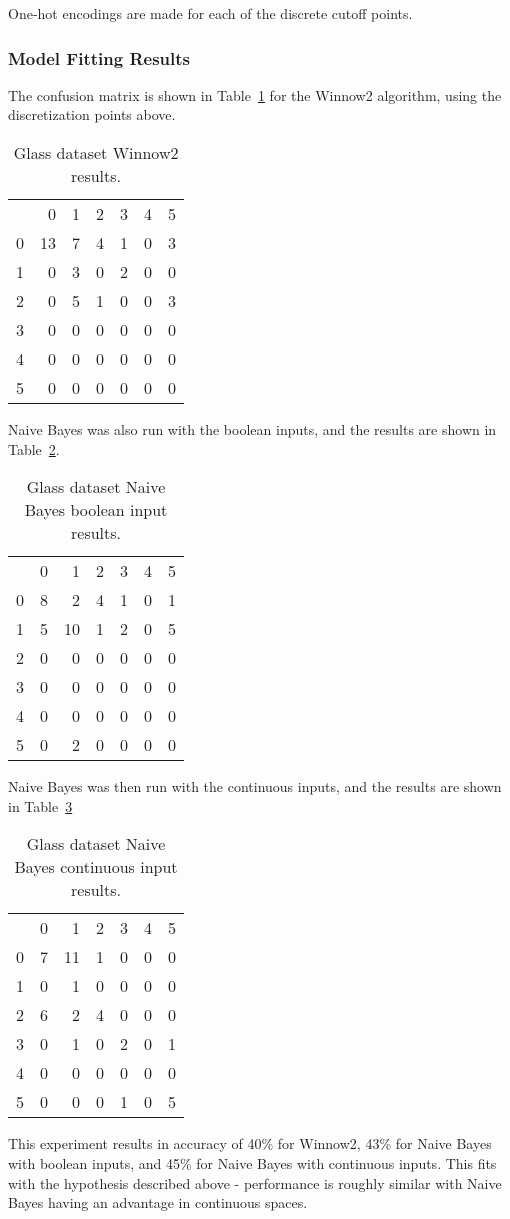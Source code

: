 \documentclass{amsart}
\begin{document}
One-hot encodings are made for each of the discrete cutoff points.

\subsubsection*{Model Fitting Results}
The confusion matrix is shown in Table~\ref{glass_winnow2} for the Winnow2 algorithm, using the
discretization points above.
\begin{table}
\begin{tabular}{lrrrrrr}
{} &   0 &  1 &  2 &  3 & 4 &  5 \\
0 &  13 &  7 &  4 &  1 & 0& 3 \\
1 &   0 &  3 &  0 &  2 &  0& 0 \\
2 &   0 &  5 &  1 &  0 &  0&3 \\
3 &   0 &  0 &  0 &  0 &  0& 0 \\
4 &   0 &  0 &  0 & 0 & 0 & 0 \\
5 &   0 &  0 &  0 &  0 &  0&0 \\
\end{tabular}
\label{glass_winnow2}
\caption{Glass dataset Winnow2 results.}
\end{table}
Naive Bayes was also run with the boolean inputs, and the results are shown in Table~\ref{nb_glass_bool}.
\begin{table}
\begin{tabular}{lrrrrrr}
{} &  0 &   1 &  2 &  3 &  4& 5 \\
0 &  8 &   2 &  4 &  1 &  0&1 \\
1 &  5 &  10 &  1 &  2 &  0&5 \\
2 &  0 &   0 &  0 &  0 &  0&0 \\
3 &  0 &   0 &  0 &  0 &  0&0 \\
4 &  0 &   0 &  0 &  0 &  0 &0 \\
5 &  0 &   2 &  0 &  0 &  0&0 \\
\end{tabular}
\label{nb_glass_bool}
\caption{Glass dataset Naive Bayes boolean input results.}
\end{table}
Naive Bayes was then run with the continuous inputs, and the results are shown in Table~\ref{nb_glass}
\begin{table}
\begin{tabular}{lrrrrrr}
{}&  0 &   1 &  2 &  3 & 4 & 5 \\
0 &  7 &  11 &  1 &  0 &  0 & 0 \\
1 &  0 &   1 &  0 &  0 &  0 & 0 \\
2 &  6 &   2 &  4 &  0 &  0 & 0 \\
3 &  0 &   1 &  0 &  2 &  0 & 1 \\
4 &  0 &   0 &  0 &  0 &  0 & 0 \\
5 &  0 &   0 &  0 &  1 &  0 & 5
\end{tabular}
\label{nb_glass}
\caption{Glass dataset Naive Bayes continuous input results.}
\end{table}
This experiment results in accuracy of 40\% for Winnow2, 43\% for Naive Bayes with boolean inputs, and
45\% for Naive Bayes with continuous inputs. This fits with the hypothesis described above - performance is
roughly similar with Naive Bayes having an advantage in continuous spaces.
\end{document}
